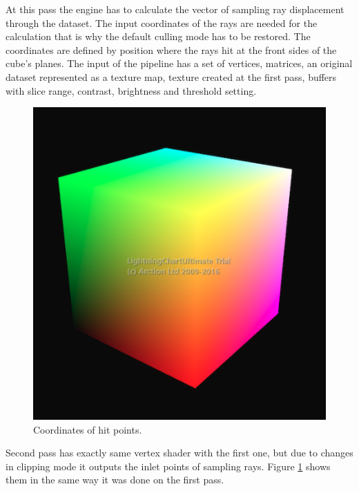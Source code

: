 \documentclass[twoside, english, 11pt]{report}
\begin{document}
At this pass the engine has to calculate the vector of sampling ray displacement through the dataset. The input coordinates of the rays are needed for the calculation that is why the default culling mode has to be restored. The coordinates are defined by position where the rays hit at the front sides of the cube's planes. The input of the pipeline has a set of vertices, matrices, an original dataset represented as a texture map, texture created at the first pass, buffers with slice range, contrast, brightness and threshold setting.\\
\begin{figure}[!h]
\centerline{\includegraphics[scale = 0.5]{img/second}}
\caption{Coordinates of hit points.\label{fig:second}}
\end{figure}

Second pass has exactly same vertex shader with the first one, but due to changes in clipping mode it outputs the inlet points of sampling rays.  Figure \ref{fig:second} shows them in the same way it was done on the first pass.\\
\end{document}
